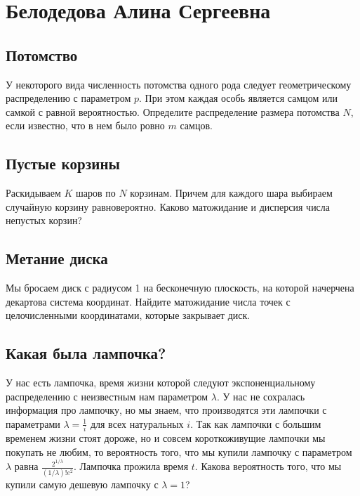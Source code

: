 \documentclass[12pt]{article}
\begin{document}

\section{Белодедова Алина Сергеевна}

\subsection{Потомство}

У некоторого вида численность потомства одного рода следует геометрическому распределению с параметром $p$. При этом каждая особь является самцом или самкой с равной вероятностью. Определите распределение размера потомства $N$, если известно, что в нем было ровно $m$ самцов.



\subsection{Пустые корзины}

Раскидываем $K$ шаров по $N$ корзинам. Причем для каждого шара выбираем случайную корзину равновероятно. Каково матожидание и дисперсия числа непустых корзин?



\subsection{Метание диска}

Мы бросаем диск с радиусом 1 на бесконечную плоскость, на которой начерчена декартова система координат. Найдите матожидание числа точек с целочисленными координатами, которые закрывает диск.



\subsection{Какая была лампочка?}

У нас есть лампочка, время жизни которой следуют экспоненциальному распределению с неизвестным нам параметром $\lambda$. У нас не сохралась информация про лампочку, но мы знаем, что производятся эти лампочки с параметрами $\lambda = \frac{1}{i}$ для всех натуральных $i$. Так как лампочки с большим временем жизни стоят дороже, но и совсем короткоживущие лампочки мы покупать не любим, то вероятность того, что мы купили лампочку с параметром $\lambda$ равна $\frac{2^{1/\lambda}}{(1/\lambda)!e^2}$. Лампочка прожила время $t$. Какова вероятность того, что мы купили самую дешевую лампочку с $\lambda = 1$?
\end{document}
